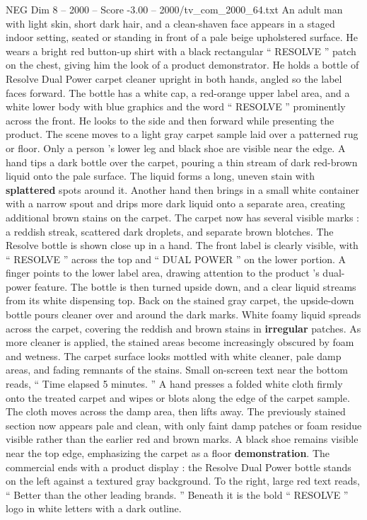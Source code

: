 \begin{textsample}{NEG Dim 8 – 2000 – Score -3.00 – 2000/tv\_com\_2000\_64.txt}  \label{ex:f8_neg_085}
An adult man with light skin, short dark hair, and a clean-shaven face appears in a staged indoor setting, seated or standing in front of a pale beige upholstered surface.
He wears a bright red button-up shirt with a black rectangular “ RESOLVE ” patch on the chest, giving him the look of a product demonstrator.
He holds a bottle of Resolve Dual Power carpet cleaner upright in both hands, angled so the label faces forward.
The bottle has a white cap, a red-orange upper label area, and a white lower body with blue graphics and the word “ RESOLVE ” prominently across the front.
He looks to the side and then forward while presenting the product.
The scene moves to a light gray carpet sample laid over a patterned rug or floor.
Only a person ’s lower leg and black shoe are visible near the edge.
A hand tips a dark bottle over the carpet, pouring a thin stream of dark red-brown liquid onto the pale surface.
The liquid forms a long, uneven stain with \textbf{splattered} spots around it.
Another hand then brings in a small white container with a narrow spout and drips more dark liquid onto a separate area, creating additional brown stains on the carpet.
The carpet now has several visible marks : a reddish streak, scattered dark droplets, and separate brown blotches.
The Resolve bottle is shown close up in a hand.
The front label is clearly visible, with “ RESOLVE ” across the top and “ DUAL POWER ” on the lower portion.
A finger points to the lower label area, drawing attention to the product ’s dual-power feature.
The bottle is then turned upside down, and a clear liquid streams from its white dispensing top.
Back on the stained gray carpet, the upside-down bottle pours cleaner over and around the dark marks.
White foamy liquid spreads across the carpet, covering the reddish and brown stains in \textbf{irregular} patches.
As more cleaner is applied, the stained areas become increasingly obscured by foam and wetness.
The carpet surface looks mottled with white cleaner, pale damp areas, and fading remnants of the stains.
Small on-screen text near the bottom reads, “ Time elapsed 5 minutes. ” A hand presses a folded white cloth firmly onto the treated carpet and wipes or blots along the edge of the carpet sample.
The cloth moves across the damp area, then lifts away.
The previously stained section now appears pale and clean, with only faint damp patches or foam residue visible rather than the earlier red and brown marks.
A black shoe remains visible near the top edge, emphasizing the carpet as a floor \textbf{demonstration}.
The commercial ends with a product display : the Resolve Dual Power bottle stands on the left against a textured gray background.
To the right, large red text reads, “ Better than the other leading brands. ” Beneath it is the bold “ RESOLVE ” logo in white letters with a dark outline.

\end{textsample}
